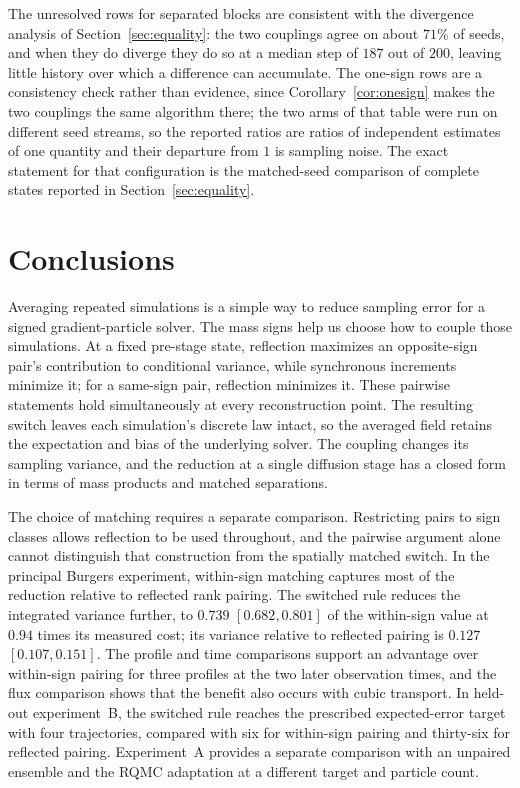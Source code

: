 \documentclass[smallextended,nospthms]{svjour3}
\theoremstyle{plain}
\theoremstyle{definition}
\theoremstyle{remark}
\numberwithin{equation}{section}
\begin{document}
The unresolved rows for separated blocks are consistent with the divergence
analysis of Section~\ref{sec:equality}: the two couplings agree on about $71\%$
of seeds, and when they do diverge they do so at a median step of $187$ out of
$200$, leaving little history over which a difference can accumulate. The
one-sign rows are a consistency check rather than evidence, since
Corollary~\ref{cor:onesign} makes the two couplings the same algorithm there;
the two arms of that table were run on different seed streams, so the reported
ratios are ratios of independent estimates of one quantity and their departure
from $1$ is sampling noise. The exact statement for that configuration is the
matched-seed comparison of complete states reported in
Section~\ref{sec:equality}.

\section{Conclusions}
\label{sec:conclusions}

Averaging repeated simulations is a simple way to reduce sampling error for
a signed gradient-particle solver. The mass signs help us choose how to couple
those simulations. At a fixed pre-stage state, reflection maximizes an
opposite-sign pair's contribution to conditional variance, while synchronous
increments minimize it; for a same-sign pair, reflection minimizes it. These
pairwise statements hold simultaneously at every reconstruction point. The
resulting switch leaves each simulation's discrete law intact, so the averaged
field retains the expectation and bias of the underlying solver. The coupling
changes its sampling variance, and the reduction at a single diffusion stage
has a closed form in terms of mass products and matched separations.

The choice of matching requires a separate comparison. Restricting pairs to
sign classes allows reflection to be used throughout, and the pairwise
argument alone cannot distinguish that construction from the spatially matched
switch. In the principal Burgers experiment, within-sign matching captures
most of the reduction relative to reflected rank pairing. The switched rule
reduces the integrated variance further, to $0.739$ $[0.682,0.801]$ of the
within-sign value at $0.94$ times its measured cost; its variance relative to
reflected pairing is $0.127$ $[0.107,0.151]$. The profile and time comparisons
support an advantage over within-sign pairing for three profiles at the two
later observation times, and the flux comparison shows that the benefit also
occurs with cubic transport. In held-out experiment~B, the switched rule reaches
the prescribed expected-error target with four trajectories, compared with six
for within-sign pairing and thirty-six for reflected pairing. Experiment~A
provides a separate comparison with an unpaired ensemble and the RQMC
adaptation at a different target and particle count.
\end{document}
